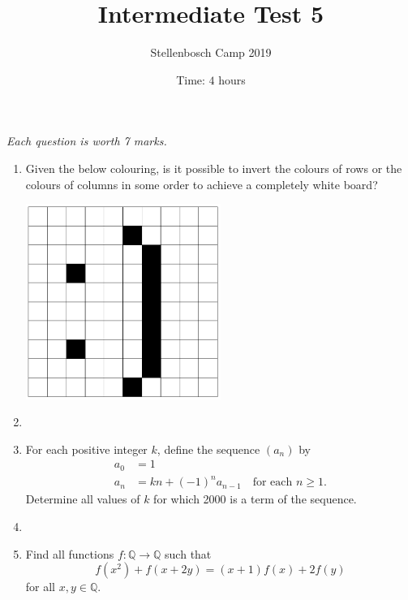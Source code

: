 \documentclass{article}
\title{Intermediate Test 5}
\author{Stellenbosch Camp 2019}
\date{Time: $4$ hours}
\begin{document}
\maketitle
\thispagestyle{empty}

\hfill\textit{Each question is worth 7 marks.}

\vfill
\vfill


\begin{enumerate}[1.]

\item %
Given the below colouring, is it possible to invert the colours of rows or the colours of columns in some order to achieve a completely white board?
\begin{center}
    \includegraphics[width=0.5\textwidth]{test_5_q_1.png}
\end{center}

\vfill

\item %


\vfill

\item %
For each positive integer $k$, define the sequence $(a_{n})$ by
\begin{align*}
	a_{0} &= 1 \\
	a_{n} &= kn + (-1)^{n}a_{n-1} \quad \text{for each } n \geqslant 1.
\end{align*}
Determine all values of $k$ for which 2000 is a term of the sequence.


\vfill

\item %


\vfill

\item %
\newcommand{\QQ}{\mathbb{Q}}
Find all functions $f : \QQ \to \QQ$ such that
\[ f(x^2) +f(x+2y) = (x+1)f(x) +2f(y) \]
for all $x, y \in \QQ$. 



\end{enumerate}
\end{document}
